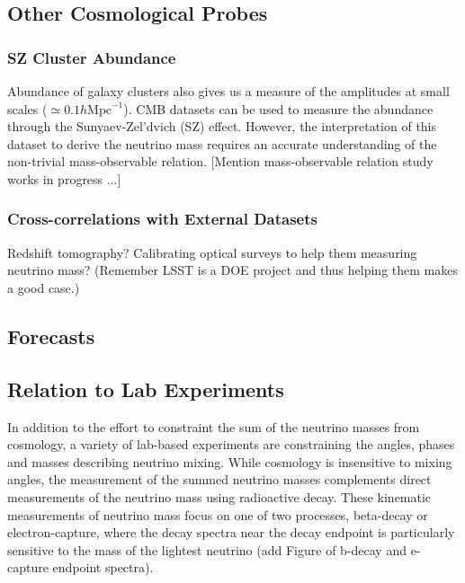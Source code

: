 \subsection{Other Cosmological Probes}

\subsubsection{SZ Cluster Abundance}
Abundance of galaxy clusters also gives us a measure of the 
amplitudes at small scales ($\simeq 0.1h\mathrm{Mpc}^{-1}$).
%
CMB datasets can be used to measure the abundance through the
Sunyaev-Zel'dvich (SZ) effect.
%
However, the interpretation of this dataset to derive the neutrino mass
 requires an accurate understanding of 
 the non-trivial mass-observable relation.
[Mention mass-observable relation study works in progress ...]


\subsubsection{Cross-correlations with External Datasets}
Redshift tomography?  Calibrating optical surveys to help them measuring
neutrino mass?  (Remember LSST is a DOE project and thus helping them
makes a good case.)


\subsection{Forecasts}

\subsection{Relation to Lab Experiments}

In addition to the effort to constraint the sum of the neutrino masses from cosmology, a variety of lab-based experiments are constraining the angles, phases and masses describing neutrino mixing.  While cosmology is insensitive to mixing angles, the measurement of the summed neutrino masses complements direct measurements of the neutrino mass using radioactive decay. These kinematic measurements of neutrino mass focus on one of two processes, beta-decay or electron-capture, where the decay spectra near the decay endpoint is particularly sensitive to the mass of the lightest neutrino (add Figure of b-decay and e-capture endpoint spectra).

